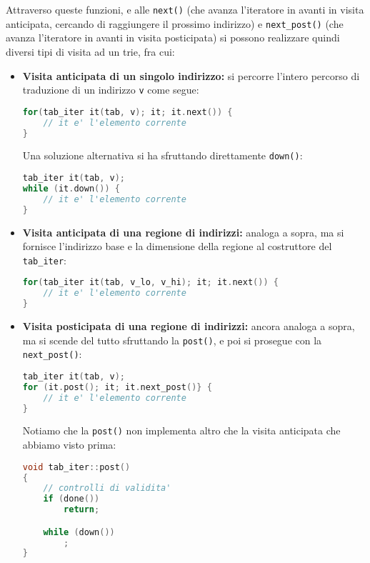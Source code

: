 \documentclass[a4paper,11pt]{article}
\begin{document}
Attraverso queste funzioni, e alle \lstinline|next()| (che avanza l'iteratore in avanti in visita anticipata, cercando di raggiungere il prossimo indirizzo) e \lstinline|next_post()| (che avanza l'iteratore in avanti in visita posticipata) si possono realizzare quindi diversi tipi di visita ad un trie, fra cui:
\begin{itemize}
	\item \textbf{Visita anticipata di un singolo indirizzo:} si percorre l'intero percorso di traduzione di un indirizzo \lstinline|v| come segue:
\begin{lstlisting}[language=C++, style=codestyle]	
for(tab_iter it(tab, v); it; it.next()) {
	// it e' l'elemento corrente
}
\end{lstlisting}

Una soluzione alternativa si ha sfruttando direttamente \lstinline|down()|:
\begin{lstlisting}[language=C++, style=codestyle]	
tab_iter it(tab, v);
while (it.down()) {
	// it e' l'elemento corrente
}
\end{lstlisting}

	\item \textbf{Visita anticipata di una regione di indirizzi:} analoga a sopra, ma si fornisce l'indirizzo base e la dimensione della regione al costruttore del \lstinline|tab_iter|: 
\begin{lstlisting}[language=C++, style=codestyle]	
for(tab_iter it(tab, v_lo, v_hi); it; it.next()) {
	// it e' l'elemento corrente
}
\end{lstlisting}
	
	\item \textbf{Visita posticipata di una regione di indirizzi:} ancora analoga a sopra, ma si scende del tutto sfruttando la \lstinline|post()|, e poi si prosegue con la \lstinline|next_post()|: 
\begin{lstlisting}[language=C++, style=codestyle]	
tab_iter it(tab, v);
for (it.post(); it; it.next_post()} {
	// it e' l'elemento corrente
}
\end{lstlisting}

Notiamo che la \lstinline|post()| non implementa altro che la visita anticipata che abbiamo visto prima:
\begin{lstlisting}[language=C++, style=codestyle]	
void tab_iter::post()
{
	// controlli di validita'
	if (done())
		return;

	while (down())
		;
}
\end{lstlisting}

\end{itemize}
\end{document}
